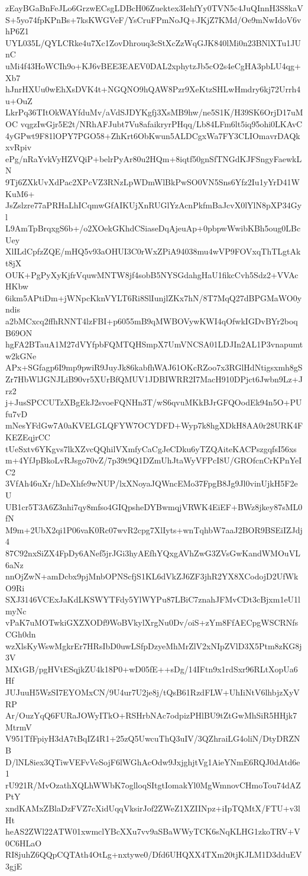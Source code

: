 zEayBGaBnFeJLo6GrzwECsgLDBcH06Zuektex3IehfYy0TVN5c4JuQInnH3S8kaV
S+5yo74fpKPnBs+7ksKWGVeF/YsCruFPmNoJQ+JKjZ7KMd/Oe9mNwIdoV6vhP6Z1
UYL035L/QYLCRke4u7Xc1ZovDhrouq3cStXcZzWqGJK840lMi0n23BNlXTu1JUnC
uMi4f43HoWCIh9o+KJ6vBEE3EAEV0DAL2xphytzJb5cO2s4eCgHA3pbLU4qg+Xb7
hJnrHXUu0wEhXsDVK4t+NGQNO9hQAW8Pzr9XeKtzSHLwHmdry6kj72Urrh4u+OuZ
LkrPq36TItOkWAYfduMv/aVdSJDYKgfj3XsMB9hw/ne5S1K/H39SK6OrjD17uMOC
vqgzIwGjr5E2t/NRhAFJubt7Vu8afaikryrPHqq/Lb84LFm6lt5iq95ohi0LKAvC
4yGPwt9F81lOPY7PGO58+ZhKrt6ObKwun5ALDCgxWa7FY3CLIOmavrDAQkxvRpiv
ePg/nRaYvkVyHZVQiP+belrPyAr80u2HQm+8iqtf50gnSfTNGdKJFSngyFaewkLN
9Tj6ZXkUvXdPac2XPcVZ3RNzLpWDmWlBkPwSO0VN5Sns6Yfz2Iu1yYrD41WKuM6+
JsZslzre77aPRHaLhICqmwGfAIKUjXnRUGlYzAcnPkfmBaJcvX0lYlN8pXP34Gyl
L9AmTpBrqxgS6b+/o2XOekGKhdCSiaseDqAjeuAp+0pbpwWwibKBh5oug0LBcUey
XlILdCpfzZQE/mHQ5v93aOHUI3C0rWxZPiA94038mu4wVP9FOVxqThTLgtAkt8jX
OUK+PgPyXyKjfrVquwMNTW8jf4sobB5NYSGdahgHaU1fikcCvh5Sdz2+VVAcHKbw
6ikm5APtiDm+jWNpcKknVYLT6Ri8SlIunjlZKx7hN/8T7MqQ27dBPGMaWO0yndis
a2bMCxcq2ffhRNNT4lzFBI+p6055mB9qMWBOVywKWI4qOfwkIGDvBYr2boqB69ON
hgFA2BTauA1M27dVYfpbFQMTQHSmpX7UmVNCSA01LDJIn2AL1P3vnapumtw2kGNe
APx+SGfagp6I9mp9pwiR9JuyJk86kabfhWAJ61OKcRZoo7x3RGlHdNtigsxmh8gS
Zr7HbWlJGNJLiB90vr5XUrBfQMUV1JDBIWRR2I7MacH910DPjct6Jwbn9Lz+Jrz2
j+JusSPCCUTzXBgEkJ2svoeFQNHn3T/wS6qvuMKkBJrGFQOodEk94n5O+PUfu7vD
mNesYFdGw7A0aKVELGLQFYW7OCYDFD+Wyp7k8hgXDkH8AA0r28URK4FKEZEqjrCC
tUeSxtv6YKgvs7lkXZvcQQhilVXmfyCaCgJeCDku6yTZQAiteKACPszgqfsI56xs
m+4YfJpBkoLvRJsgo70vZ/7p39t9Q1DZmUhJtaWyVFPcI8U/GROfcnCrKPnYeIC2
3VfAh46uXr/hDeXhfe9wNUP/lxXNoyaJQWncEMo37FpgB8Jg9Jl0vinUjkH5F2eU
UB1cr5T3A6Z3nhi7qy8mfso4GIQpsheDYBwmqjVRWK4EiEF+BWz8jkey87sML0fN
M9m+2UbX2qi1P06vaK0Rc07wvR2cpg7XlIyts+wnTqhbW7aaJ2BOR9BSEiIZJdj4
87C92nxSiZX4FpDy6ANef5jrJGi3hyAEfhYQxgAVhZwG3ZVsGwKandWMOuVL6aNz
nnOjZwN+amDcbx9pjMnbOPNScfjS1KL6dVkZJ6ZF3jhR2YX8XCodojD2UfWkO9Ri
SXJ3146VCExJaKdLKSWYTFdy5YlWYPu87LBiC7znahJFMvCDt3cBjxm1eU1lmyNc
vPaK7uMOTwkiGXZXODf9WoBVkylXrgNu0Dv/oiS+zYm8FfAECpgWSCRNfsCGh0dn
wzXlsKyWswMgkrEr7HRsIbD0uwLSfpDzyeMhMrZlV2xNIpZVlD3X5Ptm8zKG8j3V
MXtGB/pgHVtESqjkZU4k18P0+wD05fE++sDg/14IFtn9x1rdSxr96RLtXopUa6Hf
JUJuuH5WzSI7EYOMxCN/9U4ur7U2je8j/tQsB61RzdFLW+UhIiNtV6lhbjzXyVRP
Ar/OuzYqQ6FURaJOWyITkO+RSHrbNAc7odpizPHlBU9tZtGwMhSiR5HHjk7MtrmV
V951TfFpiyH3dA7tBqIZ4R1+25zQ5UwcuThQ3uIV/3QZhraiLG4oliN/DtyDRZNB
D/lNL8iex3QTiwVEFvVeSojF6lWGhAcOdw9JxjghjtVg1AieYNmE6RQJ0dAtd6e1
rU921R/MvOzathXQLhWWbK7oglloqSItgtIomakYl0MgWmnovCHmoTou74dAZPtY
xndKAMxZBlaDzFVZ7cXidUqqVksirJof2ZWeZ1XZIINpz+iIpTQMtX/FTU+v3lHt
heAS2ZWl22ATW01xwmclYBcXXu7vv9aSBaWWyTCK6sNqKLHG1zkoTRV+V0C6HLaO
RI8juhZ6QQpCQTAth4OtLg+nxtywe0/Dfd6UHQXX4TXm20tjKJLM1D3dduEV3gjE

